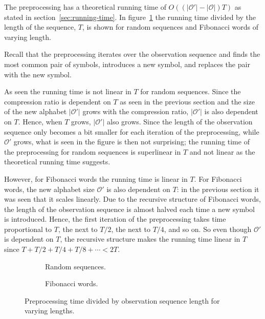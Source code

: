 The preprocessing has a theoretical running time of
$O(( \lvert\mathcal{O'}\rvert - \lvert{\mathcal{O}}\rvert) T)$ as stated in
section~\ref{sec:running-time}. In figure~\ref{fig:pre_viterbi_T} the running
time divided by the length of the sequence, $T$, is shown for random sequences
and Fibonacci words of varying length.

Recall that the preprocessing iterates over the observation sequence and finds
the most common pair of symbols, introduces a new symbol, and replaces the pair
with the new symbol.

As seen the running time is not linear in $T$ for random sequences. Since the
compression ratio is dependent on $T$ as seen in the previous section and the
size of the new alphabet $\lvert\mathcal{O'}\rvert$ grows with the compression
ratio, $\lvert\mathcal{O'}\rvert$ is also dependent on $T$. Hence, when $T$
grows, $\lvert\mathcal{O'}\rvert$ also grows. Since the length of the
observation sequence only becomes a bit smaller for each iteration of the
preprocessing, while $\mathcal{O'}$ grows, what is seen in the figure is then
not surprising; the running time of the preprocessing for random sequences is
superlinear in $T$ and not linear as the theoretical running time suggests.

However, for Fibonacci words the running time is linear in $T$. For Fibonacci
words, the new alphabet size $\mathcal{O'}$ is also dependent on $T$: in the
previous section it was seen that it scales linearly. Due to the recursive
structure of Fibonacci words, the length of the observation sequence is almost
halved each time a new symbol is introduced. Hence, the first iteration of the
preprocessing takes time proportional to $T$, the next to $T/2$, the next to
$T/4$, and so on. So even though $\mathcal{O'}$ is dependent on $T$, the
recursive structure makes the running time linear in $T$ since
$T + T/2 + T/4 + T/8 + \cdots < 2T$.

\begin{figure}
  \centering
  \begin{subfigure}[b]{0.5\textwidth}
    \centering 
    \caption{Random sequences.}
  \end{subfigure}%
  \begin{subfigure}[b]{0.5\textwidth}
    \centering 
    \caption{Fibonacci words.}
  \end{subfigure}
  \caption{Preprocessing time divided by observation sequence length for
    varying lengths.}
  \label{fig:pre_viterbi_T}
\end{figure}

